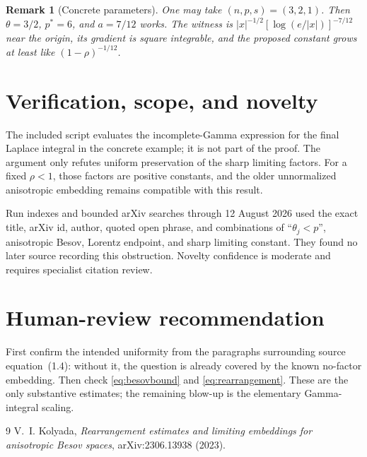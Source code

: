 \documentclass[11pt]{article}
\newtheorem{remark}[theorem]{Remark}
\begin{document}
\begin{remark}[Concrete parameters]
One may take $(n,p,s)=(3,2,1)$.  Then $\theta=3/2$, $p^*=6$, and
$a=7/12$ works.  The witness is
$|x|^{-1/2}[\log(e/|x|)]^{-7/12}$ near the origin, its gradient is square
integrable, and the proposed constant grows at least like
$(1-\rho)^{-1/12}$.
\end{remark}

\section*{Verification, scope, and novelty}

The included script evaluates the incomplete-Gamma expression for the final
Laplace integral in the concrete example; it is not part of the proof.  The
argument only refutes uniform preservation of the sharp limiting factors.
For a fixed $\rho<1$, those factors are positive constants, and the older
unnormalized anisotropic embedding remains compatible with this result.

Run indexes and bounded arXiv searches through 12 August 2026 used the exact
title, arXiv id, author, quoted open phrase, and combinations of
``$\theta_j<p$'', anisotropic Besov, Lorentz endpoint, and sharp limiting
constant.  They found no later source recording this obstruction.  Novelty
confidence is moderate and requires specialist citation review.

\section*{Human-review recommendation}

First confirm the intended uniformity from the paragraphs surrounding source
equation~(1.4): without it, the question is already covered by the known
no-factor embedding.  Then check \eqref{eq:besovbound} and
\eqref{eq:rearrangement}.  These are the only substantive estimates; the
remaining blow-up is the elementary Gamma-integral scaling.

\begin{sloppypar}
\raggedright
\begin{thebibliography}{9}
V.~I. Kolyada,
\emph{Rearrangement estimates and limiting embeddings for anisotropic Besov
spaces}, arXiv:2306.13938 (2023).
\end{thebibliography}
\end{sloppypar}
\end{document}
